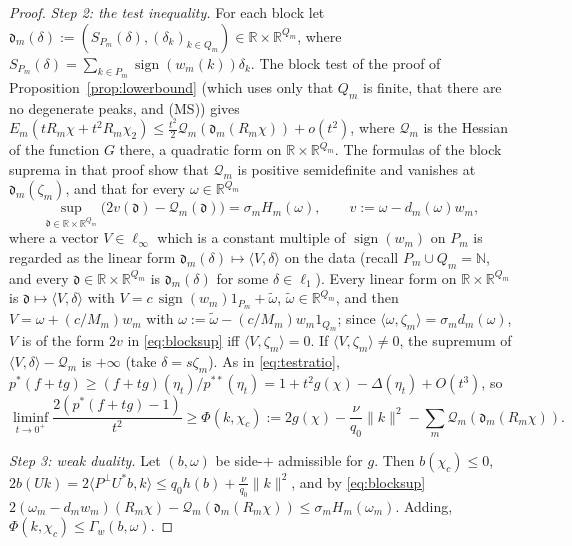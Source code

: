 \documentclass[10pt]{amsart}
\theoremstyle{definition}
\theoremstyle{remark}
\newcommand{\sgn}{\operatorname{sign}}
\newcommand{\R}{\mathbb R}
\newcommand{\N}{\mathbb N}
\newcommand{\ip}[2]{\langle #1,#2\rangle}
\begin{document}
\begin{proof}
\emph{Step 2: the test inequality.}  For each block let
$\mathfrak d_m(\delta):=(S_{P_m}(\delta),(\delta_k)_{k\in Q_m})\in
\R\times\R^{Q_m}$, where $S_{P_m}(\delta)=\sum_{k\in P_m}\sgn(w_m(k))\delta_k$.
The block test of the proof of Proposition~\ref{prop:lowerbound} (which uses
only that $Q_m$ is finite, that there are no degenerate peaks, and
\textup{(MS)}) gives $E_m(tR_m\chi+t^2R_m\chi_2)\le\frac{t^2}2\mathcal
Q_m(\mathfrak d_m(R_m\chi))+o(t^2)$, where $\mathcal Q_m$ is the Hessian
of the function $G$ there, a quadratic form on $\R\times\R^{Q_m}$.  The
formulas of the block suprema in that proof show that $\mathcal Q_m$ is
positive semidefinite and vanishes at $\mathfrak d_m(\zeta_m)$, and that
for every $\omega\in\R^{Q_m}$
\begin{equation}\label{eq:blocksup}
 \sup_{\mathfrak d\in\R\times\R^{Q_m}}\big(2v(\mathfrak d)-\mathcal Q_m(
 \mathfrak d)\big)=\sigma_mH_m(\omega),\qquad v:=\omega-d_m(\omega)w_m,
\end{equation}
where a vector $V\in\ell_\infty$ which is a constant multiple of
$\sgn(w_m)$ on $P_m$ is regarded as the linear form
$\mathfrak d_m(\delta)\mapsto\ip V\delta$ on the data (recall
$P_m\cup Q_m=\N$, and every $\mathfrak d\in\R\times\R^{Q_m}$ is
$\mathfrak d_m(\delta)$ for some $\delta\in\ell_1$).  Every linear form
on $\R\times\R^{Q_m}$ is $\mathfrak d\mapsto\ip V\delta$ with
$V=c\,\sgn(w_m)1_{P_m}+\tilde\omega$, $\tilde\omega\in\R^{Q_m}$, and then
$V=\omega+(c/M_m)w_m$ with $\omega:=\tilde\omega-(c/M_m)w_m1_{Q_m}$; since
$\ip{\omega}{\zeta_m}=\sigma_md_m(\omega)$, $V$ is of the form $2v$ in
\eqref{eq:blocksup} iff $\ip V{\zeta_m}=0$.  If $\ip V{\zeta_m}\ne0$, the
supremum of $\ip V\delta-\mathcal Q_m$ is $+\infty$ (take
$\delta=s\zeta_m$).  As in \eqref{eq:testratio}, $p^*(f+tg)\ge
(f+tg)(\eta_t)/p^{**}(\eta_t)=1+t^2g(\chi)-\Delta(\eta_t)+O(t^3)$, so
\[
 \liminf_{t\to0^+}\frac{2(p^*(f+tg)-1)}{t^2}\ge\Phi(k,\chi_c):=2g(\chi)
 -\frac\nu{q_0}\|k\|^2-\sum_m\mathcal Q_m(\mathfrak d_m(R_m\chi)).
\]

\emph{Step 3: weak duality.}  Let $(b,\omega)$ be side-$+$ admissible for
$g$.  Then $b(\chi_c)\le0$, $2b(Uk)=2\ip{P^\perp U^*b}{k}\le q_0h(b)+
\frac\nu{q_0}\|k\|^2$, and by \eqref{eq:blocksup}
$2(\omega_m-d_mw_m)(R_m\chi)-\mathcal Q_m(\mathfrak d_m(R_m\chi))\le
\sigma_mH_m(\omega_m)$.  Adding, $\Phi(k,\chi_c)\le\Gamma_w(b,\omega)$.


\end{proof}
\end{document}
